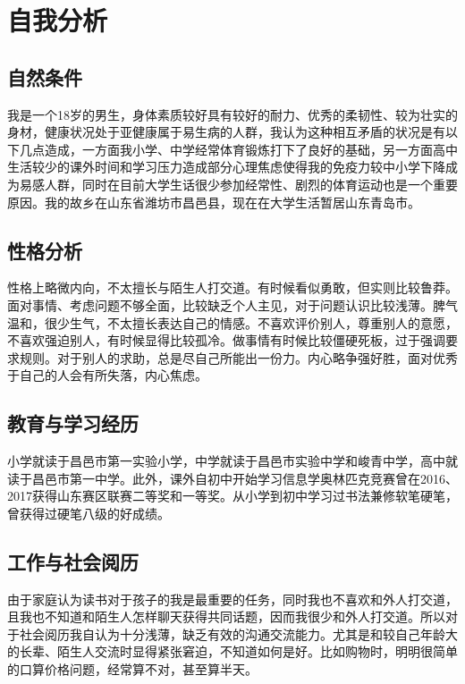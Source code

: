 \documentclass{article}
\begin{document}
\thispagestyle{empty}
\newpage
\setcounter{page}{1}
\section{自我分析}
\subsection{自然条件}
	我是一个18岁的男生，身体素质较好具有较好的耐力、优秀的柔韧性、较为壮实的身材，健康状况处于亚健康属于易生病的人群，我认为这种相互矛盾的状况是有以下几点造成，一方面我小学、中学经常体育锻炼打下了良好的基础，另一方面高中生活较少的课外时间和学习压力造成部分心理焦虑使得我的免疫力较中小学下降成为易感人群，同时在目前大学生话很少参加经常性、剧烈的体育运动也是一个重要原因。我的故乡在山东省潍坊市昌邑县，现在在大学生活暂居山东青岛市。\par 
\subsection{性格分析}
	性格上略微内向，不太擅长与陌生人打交道。有时候看似勇敢，但实则比较鲁莽。面对事情、考虑问题不够全面，比较缺乏个人主见，对于问题认识比较浅薄。脾气温和，很少生气，不太擅长表达自己的情感。不喜欢评价别人，尊重别人的意愿，不喜欢强迫别人，有时候显得比较孤冷。做事情有时候比较僵硬死板，过于强调要求规则。对于别人的求助，总是尽自己所能出一份力。内心略争强好胜，面对优秀于自己的人会有所失落，内心焦虑。\par
\subsection{教育与学习经历}
	小学就读于昌邑市第一实验小学，中学就读于昌邑市实验中学和峻青中学，高中就读于昌邑市第一中学。此外，课外自初中开始学习信息学奥林匹克竞赛曾在2016、2017获得山东赛区联赛二等奖和一等奖。从小学到初中学习过书法兼修软笔硬笔，曾获得过硬笔八级的好成绩。\par
\subsection{工作与社会阅历}
	由于家庭认为读书对于孩子的我是最重要的任务，同时我也不喜欢和外人打交道，且我也不知道和陌生人怎样聊天获得共同话题，因而我很少和外人打交道。所以对于社会阅历我自认为十分浅薄，缺乏有效的沟通交流能力。尤其是和较自己年龄大的长辈、陌生人交流时显得紧张窘迫，不知道如何是好。比如购物时，明明很简单的口算价格问题，经常算不对，甚至算半天。\par
\end{document}
